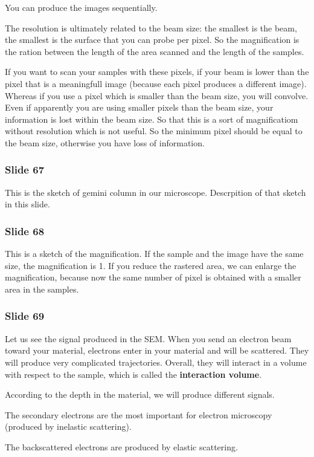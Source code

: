 \documentclass[../main/main.tex]{subfiles}
\begin{document}
You can produce the images sequentially.

The resolution is ultimately related to the beam size: the smallest is the beam, the smallest is the surface that you can probe per pixel. So the magnification is the ration between the length of the area scanned and the length of the samples.

If you want to scan your samples with these pixels, if your beam is lower than the pixel that is a meaningfull image (because each pixel produces a different image). Whereas if you use a pixel which is smaller than the beam size, you will convolve. Even if apparently you are using smaller pixels than the beam size, your information is lost within the beam size. So that this is a sort of magnificatiom without resolution which is not useful. So the minimum pixel should be equal to the beam size, otherwise you have loss of information.


\subsubsection{Slide 67}
This is the sketch of gemini column in our microscope.
Descrpition of that sketch in this slide.

\subsubsection{Slide 68}
This is a sketch of the magnification. If the sample and the image have the same size, the magnification is 1. If you reduce the rastered area, we can enlarge the magnification, because now the same number of pixel is obtained with a smaller area in the samples.

\subsubsection{Slide 69}
Let us see the signal produced in the SEM. When you send an electron beam toward your material, electrons enter in your material and will be scattered. They will produce very complicated trajectories. Overall, they will interact in a volume with respect to the sample, which is called the \textbf{interaction volume}.

According to the depth in the material, we will produce different signals.

The secondary electrons are the most important for electron microscopy (produced by inelastic scattering).

The backscattered electrons are produced by elastic scattering.
\end{document}
